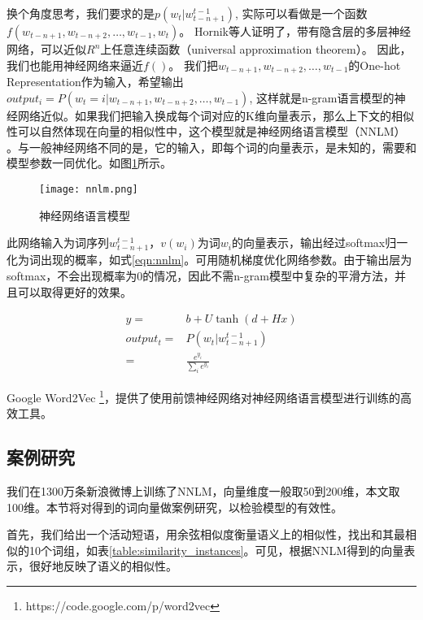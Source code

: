 换个角度思考，我们要求的是$p({w_t}|w_{t-n+1}^{t-1})$, 实际可以看做是一个函数$f(w_{t-n+1}, w_{t-n+2}, \ldots, w_{t-1}, w_t)$。 Hornik等人证明了，带有隐含层的多层神经网络，可以近似$R^n$上任意连续函数（universal approximation theorem）\cite{hornik1991approximation}。 因此，我们也能用神经网络来逼近$f()$。 我们把$w_{t-n+1}, w_{t-n+2}, \ldots, w_{t-1}$的One-hot Representation作为输入，希望输出$output_i=P(w_t=i|w_{t-n+1}, w_{t-n+2}, \ldots, w_{t-1})$, 这样就是n-gram语言模型的神经网络近似。如果我们把输入换成每个词对应的K维向量表示，那么上下文的相似性可以自然体现在向量的相似性中，这个模型就是神经网络语言模型（NNLM）\cite{bengio2006neural} \cite{mikolov2013efficient}。与一般神经网络不同的是，它的输入，即每个词的向量表示，是未知的，需要和模型参数一同优化。如图\ref{fig:nnlm}所示。

\begin{figure}[htbp]
\centering
\texttt{[image: nnlm.png]}
\caption{神经网络语言模型}
\label{fig:nnlm}
\end{figure}

此网络输入为词序列$w_{t-n+1}^{t-1}$，$v(w_i)$为词$w_i$的向量表示，输出经过softmax归一化为词出现的概率，如式\ref{eqn:nnlm}。可用随机梯度优化网络参数。由于输出层为softmax，不会出现概率为0的情况，因此不需n-gram模型中复杂的平滑方法，并且可以取得更好的效果。


\begin{equation}
\begin{aligned}
y = & b+U\tanh(d+Hx)\\
output_t = & P(w_t|w_{t-n+1}^{t-1}) \\
		= & \frac{e^{y_i}}{\sum\nolimits_i {{e^{{y_i}}}} }
\end{aligned}		
\label{eqn:nnlm}
\end{equation}


Google Word2Vec \footnote{https://code.google.com/p/word2vec}，提供了使用前馈神经网络对神经网络语言模型进行训练的高效工具。

\subsection{案例研究}
\label{sec:case_study}
我们在1300万条新浪微博上训练了NNLM，向量维度一般取50到200维，本文取100维。本节将对得到的词向量做案例研究，以检验模型的有效性。

首先，我们给出一个活动短语，用余弦相似度衡量语义上的相似性，找出和其最相似的10个词组，如表\ref{table:similarity_instances}。可见，根据NNLM得到的向量表示，很好地反映了语义的相似性。

